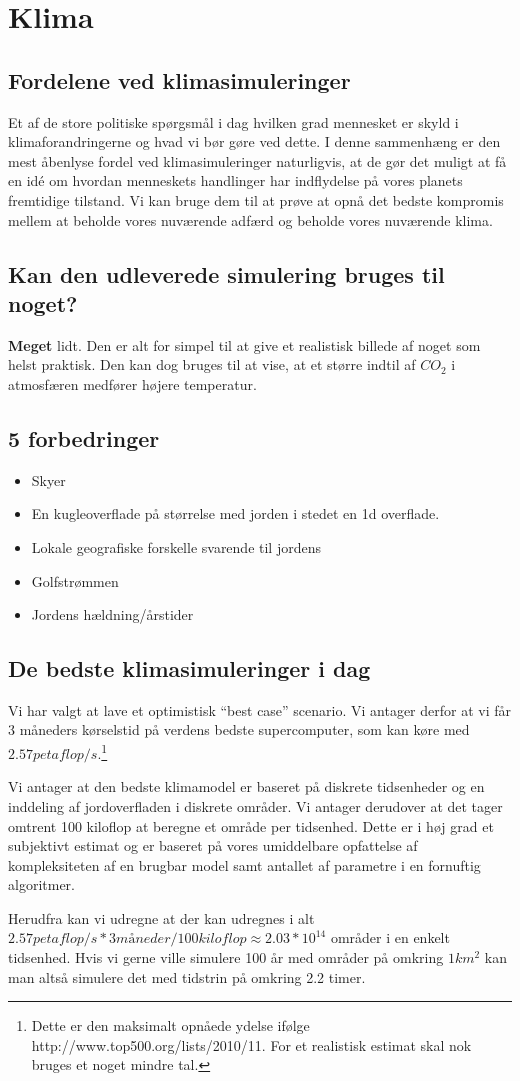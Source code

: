 \section{Klima}
\subsection{Fordelene ved klimasimuleringer}
Et af de store politiske spørgsmål i dag hvilken grad mennesket er skyld i
klimaforandringerne og hvad vi bør gøre ved dette. I denne sammenhæng er
den mest åbenlyse fordel ved klimasimuleringer naturligvis, at de gør det
muligt at få en idé om hvordan menneskets handlinger har indflydelse på vores
planets fremtidige tilstand. Vi kan bruge dem til at prøve at opnå det bedste
kompromis mellem at beholde vores nuværende adfærd og beholde vores nuværende
klima.

\subsection{Kan den udleverede simulering bruges til noget?}
{\bf Meget} lidt. Den er alt for simpel til at give et realistisk billede af
noget som helst praktisk. Den kan dog bruges til at vise, at et større indtil af
$CO_2$ i atmosfæren medfører højere temperatur.

\subsection{5 forbedringer}
\begin{itemize}
\item Skyer
\item En kugleoverflade på størrelse med jorden i stedet en 1d overflade.
\item Lokale geografiske forskelle svarende til jordens
\item Golfstrømmen
\item Jordens hældning/årstider
\end{itemize}

\subsection{De bedste klimasimuleringer i dag}
Vi har valgt at lave et optimistisk ``best case'' scenario. Vi antager
derfor at vi får 3 måneders kørselstid på verdens bedste supercomputer, som
kan køre med $2.57 petaflop/s$.\footnote{Dette er den maksimalt opnåede ydelse
ifølge http://www.top500.org/lists/2010/11. For et realistisk estimat skal nok
bruges et noget mindre tal.}

Vi antager at den bedste klimamodel er baseret på diskrete tidsenheder og en
inddeling af jordoverfladen i diskrete områder. Vi antager derudover at
det tager omtrent 100 kiloflop at beregne et område per tidsenhed. Dette er i
høj grad et subjektivt estimat og er baseret på vores umiddelbare opfattelse af
kompleksiteten af en brugbar model samt antallet af parametre i en fornuftig algoritmer.

Herudfra kan vi udregne at der kan udregnes i alt $2.57 petaflop/s * 3 måneder /
100 kiloflop \approx 2.03*10^14$ områder i en enkelt tidsenhed. Hvis vi gerne
ville simulere 100 år med områder på omkring $1 km^2$ kan man altså simulere det
med tidstrin på omkring 2.2 timer.
